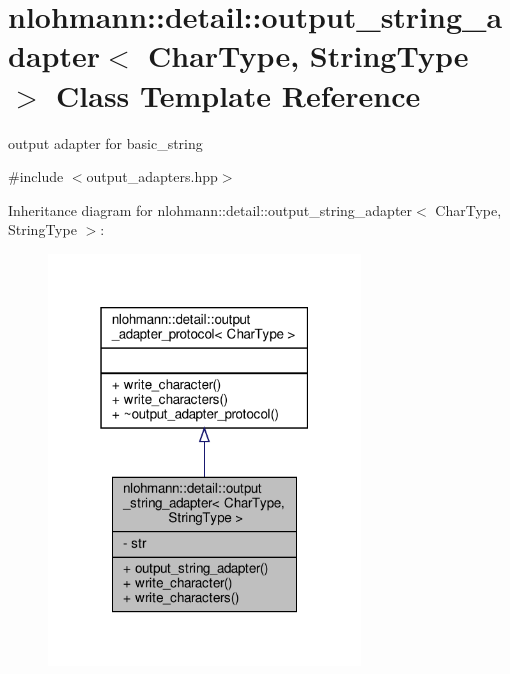 \hypertarget{classnlohmann_1_1detail_1_1output__string__adapter}{}\section{nlohmann\+:\+:detail\+:\+:output\+\_\+string\+\_\+adapter$<$ Char\+Type, String\+Type $>$ Class Template Reference}
\label{classnlohmann_1_1detail_1_1output__string__adapter}


output adapter for basic\+\_\+string  




{\ttfamily \#include $<$output\+\_\+adapters.\+hpp$>$}



Inheritance diagram for nlohmann\+:\+:detail\+:\+:output\+\_\+string\+\_\+adapter$<$ Char\+Type, String\+Type $>$\+:\nopagebreak
\begin{figure}[H]
\begin{center}
\leavevmode
\includegraphics[width=235pt]{classnlohmann_1_1detail_1_1output__string__adapter__inherit__graph}
\end{center}
\end{figure}


